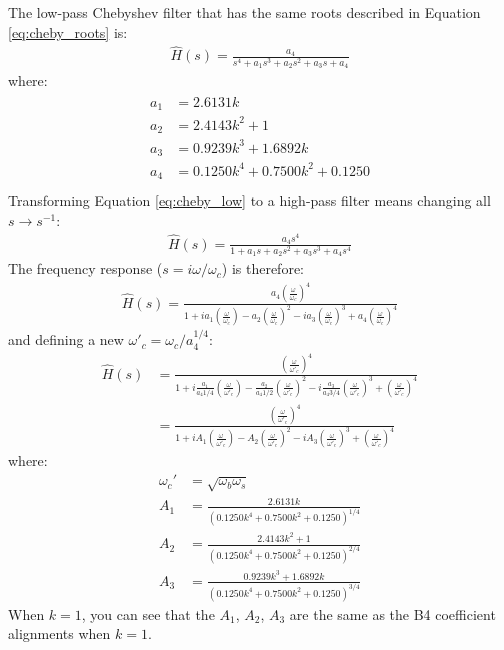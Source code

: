 \documentclass[10pt,letterpaper]{book}
\begin{document}
The low-pass Chebyshev filter that has the same roots described in Equation \ref{eq:cheby_roots} is:
\begin{align}
\hat{H}(s)=\frac{a_4}{s^4+a_1s^3+a_2s^2+a_3s+a_4}\label{eq:cheby_low}
\end{align}
where:
\begin{align}
\begin{split}
a_1&=2.6131k\\
a_2&=2.4143k^2+1\\
a_3&=0.9239k^3+1.6892k\\
a_4&=0.1250k^4+0.7500k^2+0.1250\\
\end{split}
\end{align}
Transforming Equation \ref{eq:cheby_low} to a high-pass filter means changing all $s\rightarrow s^{-1}$:
\begin{align}
\hat{H}(s)=\frac{a_4s^4}{1+a_1s+a_2s^2+a_3s^3+a_4s^4}
\end{align}
The frequency response ($s=i\omega/\omega_c$) is therefore:
\begin{align}
\hat{H}(s)=\frac{a_4\left(\frac{\omega}{\omega_c}\right)^4}{1+i a_1\left(\frac{\omega}{\omega_c}\right)-a_2\left(\frac{\omega}{\omega_c}\right)^2-ia_3\left(\frac{\omega}{\omega_c}\right)^3+a_4\left(\frac{\omega}{\omega_c}\right)^4}
\end{align}
and defining a new $\omega'_c=\omega_c /a_4^{1/4}$:
\begin{align}
\hat{H}(s)&=\frac{\left(\frac{\omega}{\omega'_c}\right)^4}{1+i\frac{a_1}{a_4{1/4}}\left(\frac{\omega}{\omega'_c}\right)-\frac{a_2}{a_4{1/2}}\left(\frac{\omega}{\omega'_c}\right)^2-i\frac{a_3}{a_4{3/4}}\left(\frac{\omega}{\omega'_c}\right)^3+\left(\frac{\omega}{\omega'_c}\right)^4}\\
&=\frac{\left(\frac{\omega}{\omega'_c}\right)^4}{1+iA_1 \left(\frac{\omega}{\omega'_c}\right)-A_2\left(\frac{\omega}{\omega'_c}\right)^2-iA_3\left(\frac{\omega}{\omega'_c}\right)^3+\left(\frac{\omega}{\omega'_c}\right)^4}
\end{align}
where:
\begin{align}
\omega_c'&=\sqrt{\omega_b\omega_s}\\
A_1&=\frac{2.6131k}{(0.1250k^4+0.7500k^2+0.1250)^{1/4}}\\
A_2&=\frac{2.4143k^2+1}{(0.1250k^4+0.7500k^2+0.1250)^{2/4}}\\
A_3&=\frac{0.9239k^3+1.6892k}{(0.1250k^4+0.7500k^2+0.1250)^{3/4}}
\end{align}
When $k=1$, you can see that the $A_1$, $A_2$, $A_3$ are the same as the B4 coefficient alignments when $k=1$.
\end{document}
